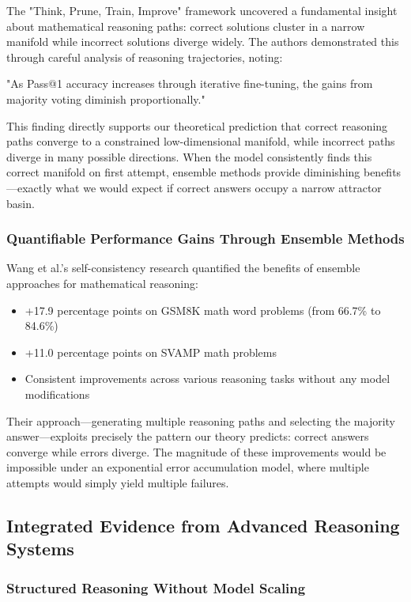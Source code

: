 \documentclass{article}
\begin{document}
The "Think, Prune, Train, Improve" framework \citep{costello2025think} uncovered a fundamental insight about mathematical reasoning paths: correct solutions cluster in a narrow manifold while incorrect solutions diverge widely. The authors demonstrated this through careful analysis of reasoning trajectories, noting:

"As Pass@1 accuracy increases through iterative fine-tuning, the gains from majority voting diminish proportionally." \citep{costello2025think}

This finding directly supports our theoretical prediction that correct reasoning paths converge to a constrained low-dimensional manifold, while incorrect paths diverge in many possible directions. When the model consistently finds this correct manifold on first attempt, ensemble methods provide diminishing benefits—exactly what we would expect if correct answers occupy a narrow attractor basin.

\subsubsection{Quantifiable Performance Gains Through Ensemble Methods}

Wang et al.'s \citep{wang2023self} self-consistency research quantified the benefits of ensemble approaches for mathematical reasoning:

\begin{itemize}
\item +17.9 percentage points on GSM8K math word problems (from 66.7\% to 84.6\%)
\item +11.0 percentage points on SVAMP math problems
\item Consistent improvements across various reasoning tasks without any model modifications
\end{itemize}

Their approach—generating multiple reasoning paths and selecting the majority answer—exploits precisely the pattern our theory predicts: correct answers converge while errors diverge. The magnitude of these improvements would be impossible under an exponential error accumulation model, where multiple attempts would simply yield multiple failures.

\subsection{Integrated Evidence from Advanced Reasoning Systems}

\subsubsection{Structured Reasoning Without Model Scaling}
\end{document}
